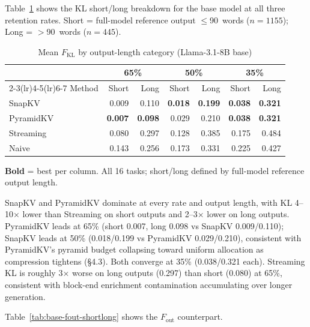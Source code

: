 \documentclass[10pt,letterpaper]{article}
\begin{document}
Table~\ref{tab:base-kl-shortlong} shows the KL short/long breakdown for the base
model at all three retention rates.
Short = full-model reference output $\leq$90~words ($n=1155$);
Long = $>$90~words ($n=445$).

\begin{table}[H]
\centering
\small
\captionsetup{justification=centering}
\caption{Mean \(F_{\text{KL}}\) by output-length category (Llama-3.1-8B base)}
\label{tab:base-kl-shortlong}
\begin{tabular}{@{}lrrrrrr@{}}
\toprule
& \multicolumn{2}{c}{65\%} & \multicolumn{2}{c}{50\%} & \multicolumn{2}{c}{35\%}\\
\cmidrule(lr){2-3}\cmidrule(lr){4-5}\cmidrule(lr){6-7}
Method & Short & Long & Short & Long & Short & Long\\
\midrule
SnapKV    & 0.009 & 0.110 & \textbf{0.018} & \textbf{0.199} & \textbf{0.038} & \textbf{0.321}\\
PyramidKV & \textbf{0.007} & \textbf{0.098} & 0.029 & 0.210 & \textbf{0.038} & \textbf{0.321}\\
Streaming & 0.080 & 0.297 & 0.128 & 0.385 & 0.175 & 0.484\\
Naive     & 0.143 & 0.256 & 0.173 & 0.331 & 0.225 & 0.427\\
\bottomrule
\end{tabular}
\center\smallskip
\textbf{Bold} = best per column.
All 16 tasks; short/long defined by full-model reference output length.
\end{table}

SnapKV and PyramidKV dominate at every rate and output length, with KL
4--10× lower than Streaming on short outputs and 2--3× lower on long outputs.
PyramidKV leads at 65\% (short 0.007, long 0.098 vs SnapKV 0.009/0.110);
SnapKV leads at 50\% (0.018/0.199 vs PyramidKV 0.029/0.210), consistent with
PyramidKV's pyramid budget collapsing toward uniform allocation as compression
tightens (§4.3). Both converge at 35\% (0.038/0.321 each). Streaming KL is
roughly 3× worse on long outputs (0.297) than short (0.080) at 65\%, consistent
with block-end enrichment contamination accumulating over longer generation.

Table~\ref{tab:base-fout-shortlong} shows the \(F_{\text{out}}\) counterpart.
\end{document}
